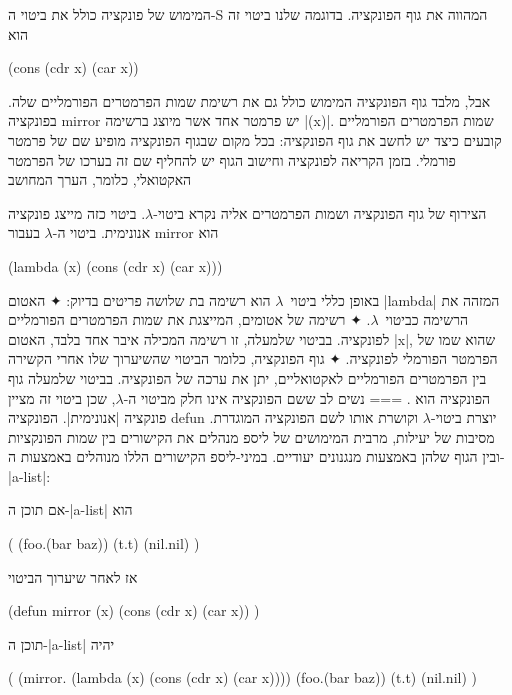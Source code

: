 המימוש של פונקציה כולל את ביטוי ה-S המהווה את גוף הפונקציה. בדוגמה שלנו ביטוי
זה הוא
\begin{LISP}
(cons (cdr x) (car x))
\end{LISP}
אבל, מלבד גוף הפונקציה המימוש כולל גם את רשימת שמות הפרמטרים הפורמליים שלה.
בפונקציה mirror יש פרמטר אחד אשר מיוצג ברשימה \T|(x)|. שמות הפרמטרים הפורמליים
קובעים כיצד יש לחשב את גוף הפונקציה: בכל מקום שבגוף הפונקציה מופיע שם של פרמטר
פורמלי. בזמן הקריאה לפונקציה וחישוב הגוף יש להחליף שם זה בערכו של הפרמטר
האקטואלי, כלומר, הערך המחושב

הצירוף של גוף הפונקציה ושמות הפרמטרים אליה נקרא ביטוי-$λ$. ביטוי כזה
מייצג פונקציה אנונימית. ביטוי ה-$λ$ בעבור mirror הוא
\begin{LISP}
  (lambda (x) (cons (cdr x) (car x)))
\end{LISP}

באופן כללי ביטוי~$λ$ הוא רשימה בת שלושה פריטים בדיוק:
✦ האטום \T|lambda| המזהה את הרשימה כביטוי~$λ$.
✦ רשימה של אטומים, המייצגת את שמות הפרמטרים הפורמליים לפונקציה.
בביטוי שלמעלה, זו רשימה המכילה איבר אחד בלבד, האטום \E|x|, שהוא שמו של הפרמטר הפורמלי לפונקציה.
✦ גוף הפונקציה, כלומר הביטוי שהשיערוך שלו אחרי הקשירה בין הפרמטרים
הפורמליים לאקטואליים, יתן את ערכה של הפונקציה. בביטוי שלמעלה גוף הפונקציה הוא
.
===
נשים לב ששם הפונקציה אינו חלק מביטוי ה-$λ$, שכן ביטוי זה מציין פונקציה
\ע|אנונימית|. הפונקציה defun יוצרת ביטוי-$λ$ וקושרת אותו לשם הפונקציה המוגדרת.
מסיבות של יעילות, מרבית המימושים של ליספ מנהלים את הקישורים בין שמות הפונקציות
ובין הגוף שלהן באמצעות מנגנונים יעודיים. במיני-ליספ הקישורים הללו מנוהלים
באמצעות ה-\E|a-list|:

אם תוכן ה-\E|a-list| הוא
\begin{LISP}
(
  (foo.(bar baz))
  (t.t)
  (nil.nil)
)
\end{LISP}
אז לאחר שיערוך הביטוי
\begin{LISP}
(defun
  mirror (x)
  (cons (cdr x) (car x))
)
\end{LISP}
תוכן ה-\E|a-list| יהיה
\begin{LISP}
(
  (mirror.
     (lambda (x)
        (cons (cdr x) (car x))))
  (foo.(bar baz))
  (t.t)
  (nil.nil)
)
\end{LISP}

